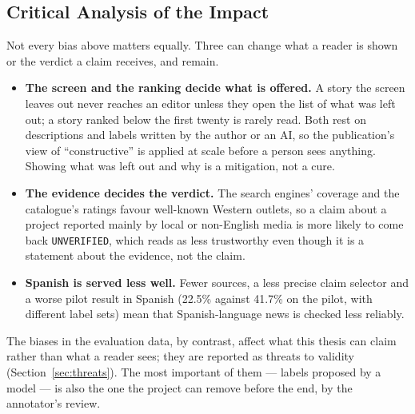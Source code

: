 
\subsection{Critical Analysis of the Impact}

Not every bias above matters equally. Three can change what a reader
is shown or the verdict a claim receives, and remain.

\begin{itemize}
    \item \textbf{The screen and the ranking decide what is offered.} A
    story the screen leaves out never reaches an editor unless they open
    the list of what was left out; a story ranked below the first twenty
    is rarely read. Both rest on descriptions and labels written by the
    author or an AI, so the publication's view of ``constructive'' is
    applied at scale before a person sees anything. Showing what was
    left out and why is a mitigation, not a cure.
    \item \textbf{The evidence decides the verdict.} The search engines'
    coverage and the catalogue's ratings favour well-known Western
    outlets, so a claim about a project reported mainly by local or
    non-English media is more likely to come back \texttt{UNVERIFIED},
    which reads as less trustworthy even though it is a statement about
    the evidence, not the claim.
    \item \textbf{Spanish is served less well.} Fewer sources, a less
    precise claim selector and a worse pilot result in Spanish (22.5\%
    against 41.7\% on the pilot, with different label sets) mean that
    Spanish-language news is checked less reliably.
\end{itemize}

The biases in the evaluation data, by contrast, affect what this thesis
can claim rather than what a reader sees; they are reported as threats
to validity (Section~\ref{sec:threats}). The most important of them ---
labels proposed by a model --- is also the one the project can remove
before the end, by the annotator's review.
